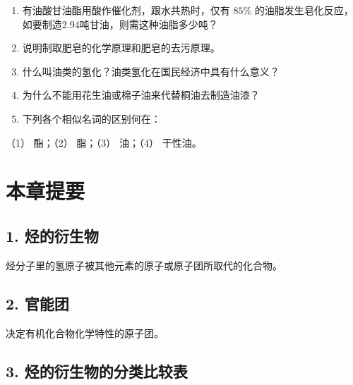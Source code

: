 \begin{enumerate}
\item
  有油酸甘油酯用酸作催化剂，跟水共热时，仅有 \(85\%\)
  的油脂发生皂化反应，如要制造2.94吨甘油，则需这种油脂多少吨？
\item
  说明制取肥皂的化学原理和肥皂的去污原理。
\item
  什么叫油类的氢化？油类氢化在国民经济中具有什么意义？
\item
  为什么不能用花生油或棉子油来代替桐油去制造油漆？
\item
  下列各个相似名词的区别何在：
\end{enumerate}

（1） 酯；（2） 脂；（3） 油；（4） 干性油。

\section{本章提要}

\subsection{1. 烃的衍生物}

烃分子里的氢原子被其他元素的原子或原子团所取代的化合物。

\subsection{2. 官能团}

决定有机化合物化学特性的原子团。

\subsection{3. 烃的衍生物的分类比较表}

